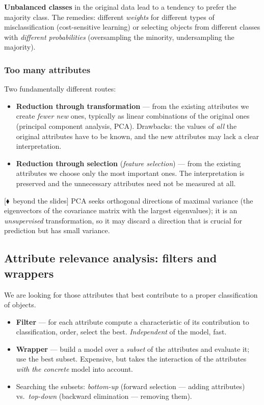 \documentclass[11pt,a4paper]{article}
\theoremstyle{definition}
\newcommand{\mimo}{\textcolor{markcol}{\textsf{\footnotesize[$\blacklozenge$~beyond the slides]}}}
\begin{document}
\textbf{Unbalanced classes} in the original data lead to a tendency to prefer the majority
class. The remedies: different \emph{weights} for different types of misclassification
(cost-sensitive learning) or selecting objects from different classes with \emph{different
probabilities} (oversampling the minority, undersampling the majority).

\subsubsection{Too many attributes}

Two fundamentally different routes:

\begin{itemize}
\item \textbf{Reduction through transformation} --- from the existing attributes we create
      \emph{fewer new} ones, typically as linear combinations of the original ones (principal
      component analysis, PCA). Drawbacks: the values of \emph{all} the original attributes have
      to be known, and the new attributes may lack a clear interpretation.
\item \textbf{Reduction through selection} (\emph{feature selection}) --- from the existing
      attributes we choose only the most important ones. The interpretation is preserved and the
      unnecessary attributes need not be measured at all.
\end{itemize}

\mimo{} PCA seeks orthogonal directions of maximal variance (the eigenvectors of the covariance
matrix with the largest eigenvalues); it is an \emph{unsupervised} transformation, so it may
discard a direction that is crucial for prediction but has small variance.

\subsection{Attribute relevance analysis: filters and wrappers}
\label{ssec:filtr}

We are looking for those attributes that best contribute to a proper classification of objects.

\begin{defbox}
\begin{itemize}
\item \textbf{Filter} --- for each attribute compute a characteristic of its contribution to
      classification, order, select the best. \emph{Independent} of the model, fast.
\item \textbf{Wrapper} --- build a model over a \emph{subset} of the attributes and evaluate
      it; use the best subset. Expensive, but takes the interaction of the attributes
      \emph{with the concrete} model into account.
\item Searching the subsets: \emph{bottom-up} (forward selection --- adding attributes)
      vs.\ \emph{top-down} (backward elimination --- removing them).
\end{itemize}
\end{defbox}
\end{document}
